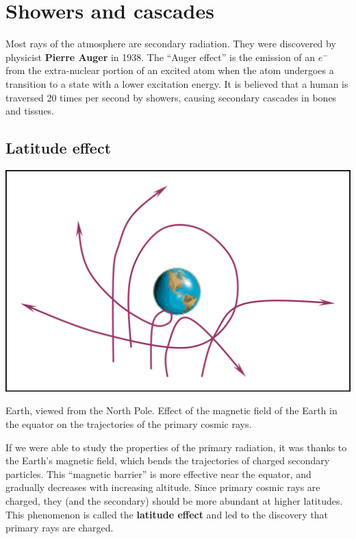 	\section{Showers and cascades}

	Most rays of the atmosphere are secondary radiation. They were discovered by physicist \textbf{Pierre Auger} in 1938. The \enquote{Auger effect} is the emission of an $e^-$ from the extra-nuclear portion of an excited atom when the atom undergoes a transition to a state with a lower excitation energy. It is believed that a human is traversed 20 times per second by showers, causing secondary cascades in bones and tissues.

	\subsection{Latitude effect}

	\bfi[H]		
		\begin{minipage}[s]{0.3\textwidth} 
	    	\bc\includegraphics[width=\textwidth]{img/earth.jpg}\ec
		\end{minipage}
		\begin{minipage}[s]{0.7\textwidth} 
      		\captionsetup{width=0.8\textwidth}
			\caption[Earth, viewed from the North Pole.]{Earth, viewed from the North Pole. Effect of the magnetic field of the Earth in the equator on the trajectories of the primary cosmic rays.}\label{fig:earth}
		\end{minipage}
	\efi\captionsetup{width=0.8\textwidth}


	If we were able to study the properties of the primary radiation, it was thanks to the Earth's magnetic field, which bends the trajectories of charged secondary particles. This \enquote{magnetic barrier} is more effective near the equator, and gradually decreases with increasing altitude. Since primary cosmic rays are charged, they (and the secondary) should be more abundant at higher latitudes. This phenomenon is called the \textbf{latitude effect} and led to the discovery that primary rays are charged.

